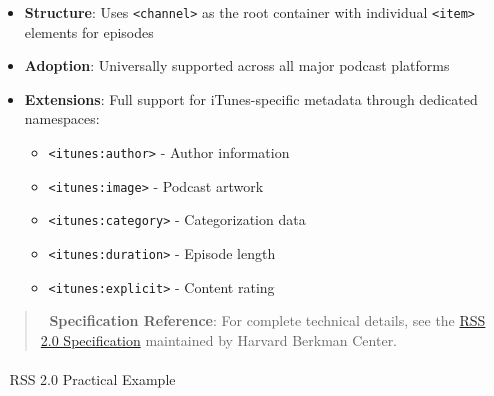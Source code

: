 \documentclass[
  letterpaper,
  DIV=11,
  numbers=noendperiod]{scrartcl}
\makeatletter
\let\oldparagraph\paragraph
\renewcommand{\paragraph}{
    \@ifstar
      \xxxParagraphStar
      \xxxParagraphNoStar
  }
\newcommand{\xxxParagraphStar}[1]{\oldparagraph*{#1}\mbox{}}
\newcommand{\xxxParagraphNoStar}[1]{\oldparagraph{#1}\mbox{}}
\providecommand{\tightlist}{%
  \setlength{\itemsep}{0pt}\setlength{\parskip}{0pt}}\usepackage{longtable,booktabs,array}
\makeatother
\begin{document}
\begin{itemize}
\tightlist
\item
  \textbf{Structure}: Uses \texttt{\textless{}channel\textgreater{}} as
  the root container with individual
  \texttt{\textless{}item\textgreater{}} elements for episodes
\item
  \textbf{Adoption}: Universally supported across all major podcast
  platforms
\item
  \textbf{Extensions}: Full support for iTunes-specific metadata through
  dedicated namespaces:

  \begin{itemize}
  \tightlist
  \item
    \texttt{\textless{}itunes:author\textgreater{}} - Author information
  \item
    \texttt{\textless{}itunes:image\textgreater{}} - Podcast artwork
  \item
    \texttt{\textless{}itunes:category\textgreater{}} - Categorization
    data
  \item
    \texttt{\textless{}itunes:duration\textgreater{}} - Episode length
  \item
    \texttt{\textless{}itunes:explicit\textgreater{}} - Content rating
  \end{itemize}
\end{itemize}

\begin{quote}
📖 \textbf{Specification Reference}: For complete technical details, see
the \href{https://cyber.harvard.edu/rss/rss.html}{RSS 2.0 Specification}
maintained by Harvard Berkman Center.
\end{quote}

\paragraph{📝 RSS 2.0 Practical
Example}\label{rss-2.0-practical-example}
\end{document}
